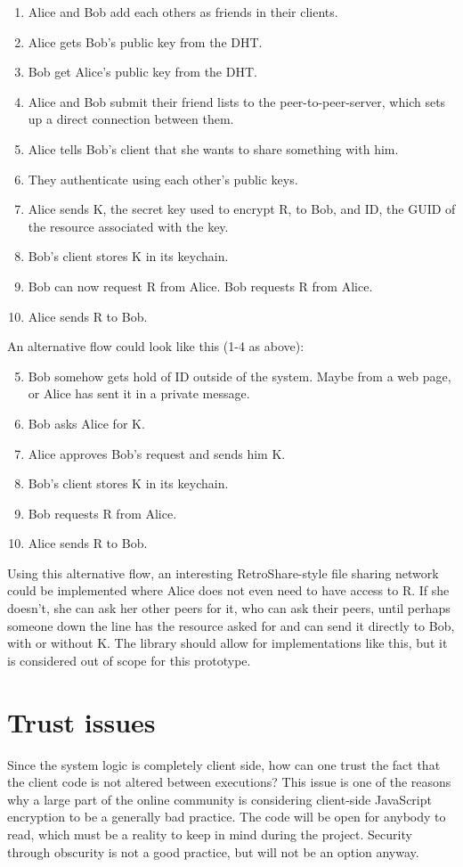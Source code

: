 \begin{enumerate}
  \item Alice and Bob add each others as friends in their clients.
  \item Alice gets Bob’s public key from the DHT.
  \item Bob get Alice’s public key from the DHT. 
  \item Alice and Bob submit their friend lists to the peer-to-peer-server, which sets up a direct connection between them.
  \item Alice tells Bob’s client that she wants to share something with him.
  \item They authenticate using each other’s public keys.
  \item Alice sends K, the secret key used to encrypt R, to Bob, and ID, the GUID of the resource associated with the key.
  \item Bob’s client stores K in its keychain.
 \item Bob can now request R from Alice. Bob requests R from Alice.
 \item Alice sends R to Bob.
\end{enumerate}

An alternative flow could look like this (1-4 as above):
\begin{enumerate}
\setcounter{enumi}{4}
\item Bob somehow gets hold of ID outside of the system. Maybe from a web page, or Alice has sent it in a private message.
\item Bob asks Alice for K.
\item Alice approves Bob’s request and sends him K.
\item Bob’s client stores K in its keychain.
\item Bob requests R from Alice.
\item Alice sends R to Bob.
\end{enumerate}
Using this alternative flow, an interesting RetroShare-style file sharing network could be implemented where Alice does not even need to have access to R. If she doesn’t, she can ask her other peers for it, who can ask their peers, until perhaps someone down the line has the resource asked for and can send it directly to Bob, with or without K. The library should allow for implementations like this, but it is considered out of scope for this prototype.
\section{Trust issues}
Since the system logic is completely client side, how can one trust the fact that the client code is not altered between executions? This issue is one of the reasons why a large part of the online community is considering client-side JavaScript encryption to be a generally bad practice. The code will be open for anybody to read, which must be a reality to keep in mind during the project. Security through obscurity is not a good practice, but will not be an option anyway.


